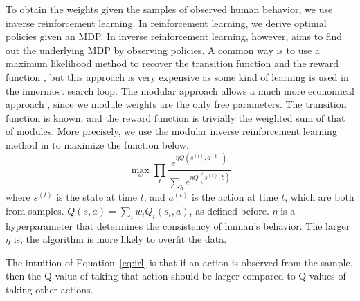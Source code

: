 To obtain the weights given the samples of observed human behavior, we use inverse
reinforcement learning. In reinforcement learning, we derive 
optimal policies given an MDP. In inverse reinforcement learning, however, aims to
find out the underlying MDP by observing policies. A common
way is to use a maximum likelihood method to recover the transition function and
the reward function \cite{ng2000algorithms}, but this approach is very expensive
as some kind of learning is used in the innermost search loop. The modular
approach allows a much more economical approach \cite{rothkopf2013modular},
since we module weights are the only free parameters. The transition function is
known, and the reward function is trivially the weighted sum of that of modules.
More precisely, we use the modular inverse reinforcement learning method in
\cite{rothkopf2013modular} to maximize the function below.
\begin{equation}
\label{eq:irl}
\max_w \prod_t \frac{e^{\eta Q(s^{(t)}, a^{(t)})}}{\sum_b e^{\eta Q(s^{(t)}, b)}}
\end{equation}
where $s^{(t)}$ is the state at time $t$, and $a^{(t)}$ is the action at time
$t$, which are both from samples. $Q(s, a) = \sum_i w_i Q_i(s_i, a)$, as defined
before. $\eta$ is a hyperparameter that determines the consistency of human's
behavior. The larger $\eta$ is, the algorithm is more likely to overfit the data.

The intuition of Equation~\ref{eq:irl} is that if an action is observed from the
sample, then the Q value of taking that action should be larger compared to Q
values of taking other actions.


